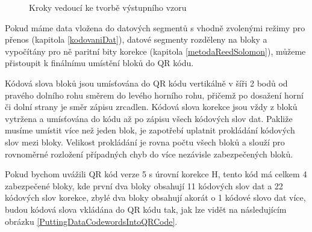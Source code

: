 \begin{figure}[H]
  \begin{center}
    \caption{Kroky vedoucí ke tvorbě výstupního vzoru}
    \label{CreatingOutputPatternProcess}
  \end{center}
\end{figure}

Pokud máme data vložena do datových segmentů s vhodně zvolenými režimy pro 
přenos (kapitola \ref{kodovaniDat}), datové segmenty rozděleny na bloky a vypočítány pro
ně paritní bity korekce (kapitola \ref{metodaReedSolomon}), můžeme přistoupit k finálnímu
umístění bloků do QR kódu.

Kódová slova bloků jsou umísťována do QR kódu vertikálně v šíři 2 bodů od 
pravého dolního rohu směrem do levého horního rohu, přičemž po dosažení 
horní či dolní strany je směr zápisu zrcadlen. Kódová slova korekce jsou 
vždy z bloků vytržena a umísťována do kódu až po zápisu všech kódových 
slov dat. Pakliže musíme umístit více než jeden blok, je zapotřebí uplatnit 
prokládání kódových slov mezi bloky. Velikost prokládání je rovna počtu všech 
bloků a slouží pro rovnoměrné rozložení případných chyb do více nezávisle 
zabezpečených bloků. 

Pokud bychom uvážili QR kód verze 5 s úrovní korekce H, 
tento kód má celkem 4 zabezpečené bloky, kde první dva bloky obsahují 11 
kódových slov dat a 22 kódových slov korekce, zbylé dva bloky obsahují akorát 
o 1 kódové slovo dat více, budou kódová slova vkládána do QR kódu tak, jak 
lze vidět na následujícím obrázku \ref{PuttingDataCodewordsIntoQRCode}.

